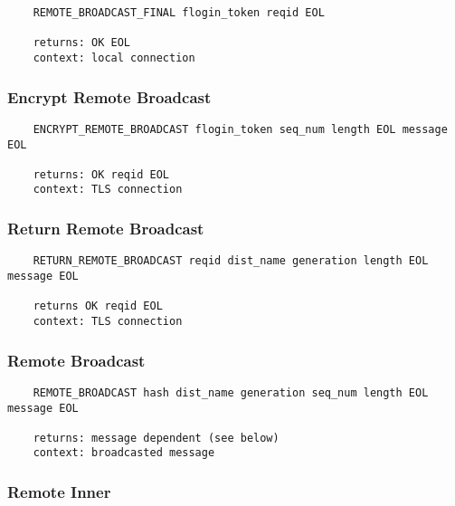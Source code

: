 \documentclass[letterpaper,11pt,oneside]{article}
\begin{document}
\vspace{10pt}
\begin{verbatim}
    REMOTE_BROADCAST_FINAL flogin_token reqid EOL 

    returns: OK EOL
    context: local connection
\end{verbatim}
\vspace{10pt}

\subsubsection{Encrypt Remote Broadcast}

\vspace{10pt}
\begin{verbatim}
    ENCRYPT_REMOTE_BROADCAST flogin_token seq_num length EOL message EOL

    returns: OK reqid EOL
    context: TLS connection
\end{verbatim}
\vspace{10pt}

\subsubsection{Return Remote Broadcast}

\vspace{10pt}
\begin{verbatim}
    RETURN_REMOTE_BROADCAST reqid dist_name generation length EOL message EOL

    returns OK reqid EOL
    context: TLS connection
\end{verbatim}
\vspace{10pt}

\subsubsection{Remote Broadcast}

\vspace{10pt}
\begin{verbatim}
    REMOTE_BROADCAST hash dist_name generation seq_num length EOL message EOL

    returns: message dependent (see below)
    context: broadcasted message
\end{verbatim}
\vspace{10pt}

\subsubsection{Remote Inner}
\end{document}
